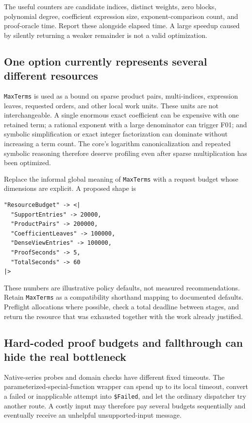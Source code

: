 The useful counters are candidate indices, distinct weights, zero blocks, polynomial degree, coefficient expression size, exponent-comparison count, and proof-oracle time. Report these alongside elapsed time. A large speedup caused by silently returning a weaker remainder is not a valid optimization.

\subsection{One option currently represents several different resources}

\texttt{MaxTerms} is used as a bound on sparse product pairs, multi-indices, expression leaves, requested orders, and other local work units. These units are not interchangeable. A single enormous exact coefficient can be expensive with one retained term; a rational exponent with a large denominator can trigger F01; and symbolic simplification or exact integer factorization can dominate without increasing a term count. The core's logarithm canonicalization and repeated symbolic reasoning therefore deserve profiling even after sparse multiplication has been optimized.\cite{core,parameterized,native,gammainverse}

Replace the informal global meaning of \texttt{MaxTerms} with a request budget whose dimensions are explicit. A proposed shape is
\begin{lstlisting}
"ResourceBudget" -> <|
  "SupportEntries" -> 20000,
  "ProductPairs" -> 200000,
  "CoefficientLeaves" -> 100000,
  "DenseViewEntries" -> 100000,
  "ProofSeconds" -> 5,
  "TotalSeconds" -> 60
|>
\end{lstlisting}
These numbers are illustrative policy defaults, not measured recommendations. Retain \texttt{MaxTerms} as a compatibility shorthand mapping to documented defaults. Preflight allocations where possible, check a total deadline between stages, and return the resource that was exhausted together with the work already justified.

\subsection{Hard-coded proof budgets and fallthrough can hide the real bottleneck}

Native-series probes and domain checks have different fixed timeouts. The parameterized-special-function wrapper can spend up to its local timeout, convert a failed or inapplicable attempt into \texttt{\$Failed}, and let the ordinary dispatcher try another route. A costly input may therefore pay several budgets sequentially and eventually receive an unhelpful unsupported-input message.\cite{parameterized,native,inverseexpressions}

